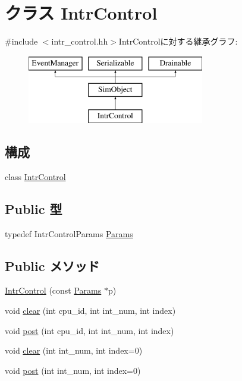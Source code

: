 \hypertarget{classIntrControl}{
\section{クラス IntrControl}
\label{classIntrControl}
}


{\ttfamily \#include $<$intr\_\-control.hh$>$}IntrControlに対する継承グラフ:\begin{figure}[H]
\begin{center}
\leavevmode
\includegraphics[height=3cm]{classIntrControl}
\end{center}
\end{figure}
\subsection*{構成}
\begin{DoxyCompactItemize}
\item 
class \hyperlink{classIntrControl_1_1IntrControl}{IntrControl}
\end{DoxyCompactItemize}
\subsection*{Public 型}
\begin{DoxyCompactItemize}
\item 
typedef IntrControlParams \hyperlink{classIntrControl_afd5ff96050f97729223377021ae69b8f}{Params}
\end{DoxyCompactItemize}
\subsection*{Public メソッド}
\begin{DoxyCompactItemize}
\item 
\hyperlink{classIntrControl_a9e818793118edc46a25d5807eb1f9b45}{IntrControl} (const \hyperlink{classIntrControl_afd5ff96050f97729223377021ae69b8f}{Params} $\ast$p)
\item 
void \hyperlink{classIntrControl_a82089f360a335ee396b89d844c278968}{clear} (int cpu\_\-id, int int\_\-num, int index)
\item 
void \hyperlink{classIntrControl_aa6e4c477d43213ac8c5adc393174e293}{post} (int cpu\_\-id, int int\_\-num, int index)
\item 
void \hyperlink{classIntrControl_a098e2b8c60729263ec5c391565c9828d}{clear} (int int\_\-num, int index=0)
\item 
void \hyperlink{classIntrControl_ad3c0d3b058eaa42aa0181bd1dc61e3c9}{post} (int int\_\-num, int index=0)
\end{DoxyCompactItemize}
